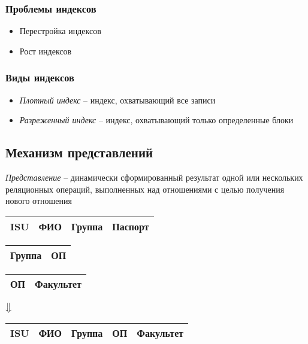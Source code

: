 \documentclass[12pt, a4paper]{article}
\begin{document}
\subsubsection{Проблемы индексов}
\begin{itemize}
    \item Перестройка индексов
    \item Рост индексов
\end{itemize}

\subsubsection{Виды индексов}
\begin{itemize}
    \item \emph{Плотный индекс} -- индекс, охватывающий все записи
    \item \emph{Разреженный индекс} -- индекс, охватывающий только определенные блоки
\end{itemize}

\subsection{Механизм представлений}
\emph{Представление} -- динамически сформированный результат одной или нескольких реляционных операций, выполненных над отношениями с целью получения нового отношения

\begin{center}
    \begin{tabular}{|c|c|c|c|}
         \hline ISU & ФИО & Группа & Паспорт \\
         \hline 
    \end{tabular}
    \begin{tabular}{|c|c|}
         \hline Группа & ОП \\
         \hline
    \end{tabular}
    \begin{tabular}{|c|c|}
         \hline ОП & Факультет \\
         \hline
    \end{tabular}
    
    $\big\Downarrow$
    
    \begin{tabular}{|c|c|c|c|c|}
        \hline ISU & ФИО & Группа & ОП & Факультет \\
        \hline
    \end{tabular}
\end{center}
\end{document}
